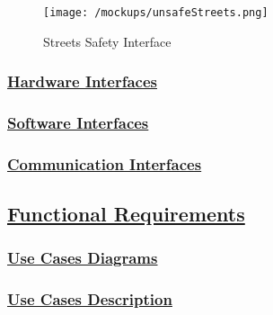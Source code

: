 	 \begin{figure}[h]
	 	\centering
	 	\begin{minipage}{0.45\textwidth}
	 		\centering
	 		\texttt{[image: /mockups/unsafeStreets.png]}
	 		\caption{Streets Safety Interface}
	 	\end{minipage}
 		\begin{minipage}{0.45\textwidth}
 			
 		\end{minipage}
	 \end{figure} 
	\FloatBarrier
	\subsubsection[Hardware Interfaces]{\hyperlink{toc}{Hardware Interfaces}}
	\subsubsection[Software Interfaces]{\hyperlink{toc}{Software Interfaces}}
	\subsubsection[Communication Interfaces]{\hyperlink{toc}{Communication Interfaces}}

\subsection[Functional Requirements]{\hyperlink{toc}{Functional Requirements}}

\subsubsection[Use Cases Diagrams]{\hyperlink{toc}{Use Cases Diagrams}}

\subsubsection[Use Cases Description]{\hyperlink{toc}{Use Cases Description}}
	\label{sec:useCases}
	
